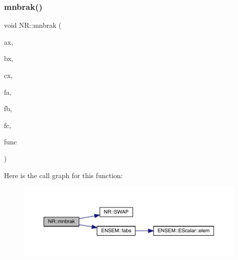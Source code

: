 \mbox{\label{namespaceNR_ab3df1c654ea34ede65a545dc399a8e43}} 
\subsubsection{\texorpdfstring{mnbrak()}{mnbrak()}\hspace{0.1cm}{\footnotesize\ttfamily [1/2]}}
{\footnotesize\ttfamily void N\+R\+::mnbrak (\begin{DoxyParamCaption}\item[{\mbox{\hyperlink{namespaceNR_af6ff762dd605ff477b8e52387253a02a}{DP}} \&}]{ax,  }\item[{\mbox{\hyperlink{namespaceNR_af6ff762dd605ff477b8e52387253a02a}{DP}} \&}]{bx,  }\item[{\mbox{\hyperlink{namespaceNR_af6ff762dd605ff477b8e52387253a02a}{DP}} \&}]{cx,  }\item[{\mbox{\hyperlink{namespaceNR_af6ff762dd605ff477b8e52387253a02a}{DP}} \&}]{fa,  }\item[{\mbox{\hyperlink{namespaceNR_af6ff762dd605ff477b8e52387253a02a}{DP}} \&}]{fb,  }\item[{\mbox{\hyperlink{namespaceNR_af6ff762dd605ff477b8e52387253a02a}{DP}} \&}]{fc,  }\item[{const \mbox{\hyperlink{classNR_1_1ScalFunc}{Scal\+Func}} \&}]{func }\end{DoxyParamCaption})}

Here is the call graph for this function\+:
\nopagebreak
\begin{figure}[H]
\begin{center}
\leavevmode
\includegraphics[width=350pt]{da/d46/namespaceNR_ab3df1c654ea34ede65a545dc399a8e43_cgraph}
\end{center}
\end{figure}
\mbox{\label{namespaceNR_a3fb2c9900887232361156bb23c4a3035}} 
